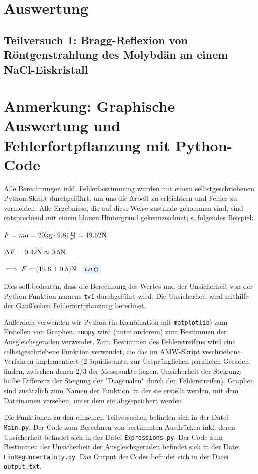 \documentclass{article}
\newcommand{\coderef}[1]{
    \text{
        \enspace
        \footnotesize
        \colorbox{codebg}{\texttt{#1()}}
    }
}
\begin{document}
\newpage

\section{Auswertung}

    \subsection{Teilversuch 1: Bragg-Reflexion von Röntgenstrahlung des Molybdän an einem NaCl-Eiskristall}

    \newpage

\section{Anmerkung: Graphische Auswertung und Fehlerfortpflanzung mit Python-Code}

Alle Berechnungen inkl. Fehlerbestimmung wurden mit einem selbstgeschriebenen
Python-Skript durchgeführt, um uns die Arbeit zu erleichtern und Fehler zu
vermeiden. Alle Ergebnisse, die auf diese Weise zustande gekommen sind,
sind entsprechend mit einem \colorbox{codebg}{blauen Hintergrund} gekennzeichnet;
s. folgendes Beispiel:

$F = m a = 20 \text{kg} \cdot 9.81 \frac{\text m}{\text s^2} = 19.62 \text N$

$\Delta F = 0.42 \text N \approx 0.5 \text N$

$\implies F = (19.6 \pm 0.5) \text N \coderef{tv1}$

Dies soll bedeuten, dass die Berechnung des Wertes und der Unsicherheit von der
Python-Funktion namens \verb|tv1| durchgeführt wird.
Die Unsicherheit wird mithilfe der Gauß'schen Fehlerfortpflanzung berechnet.

Außerdem verwenden wir Python (in Kombination mit \texttt{matplotlib})
zum Erstellen von Graphen. \texttt{numpy} wird (unter anderem) zum Bestimmen der
Ausgleichsgeraden verwendet. Zum Bestimmen des Fehlerstreifens wird eine
selbstgeschriebene Funktion verwendet, die das im AMW-Skript veschriebene Verfahren
implementiert (2 äquidistante, zur Ürsprünglichen parallelen Geraden finden,
zwischen denen 2/3 der Messpunkte liegen. Unsicherheit der Steigung:
halbe Differenz der Steigung der "Diagonalen" durch den Fehlerstreifen).
Graphen sind zusätzlich zum Namen der Funktion, in der sie erstellt werden,
mit dem Dateinamen versehen, unter dem sie abgespeichert werden.

Die Funktionen zu den einzelnen Teilversuchen befinden sich in der Datei
\verb|Main.py|. Der Code zum Berechnen von bestimmten Ausdrücken
inkl. deren Unsicherheit befindet sich in der Datei \verb|Expressions.py|.
Der Code zum Bestimmen der Unsicherheit der Ausgleichsgeraden
befindet sich in der Datei \\ \verb|LinRegUncertainty.py|.
Das Output des Codes befindet sich in der Datei \verb|output.txt|.
\end{document}
